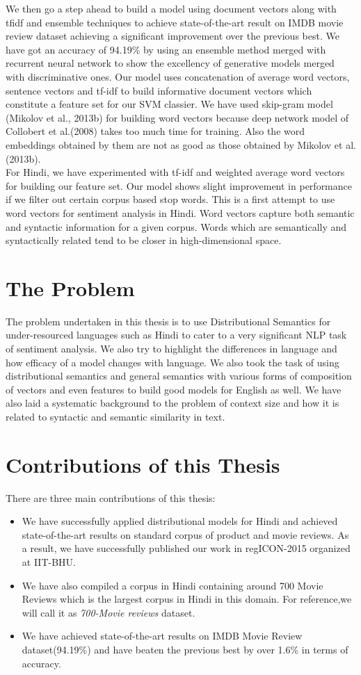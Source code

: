 We then go a step ahead to build a model using document vectors along with tfidf and ensemble techniques to achieve state-of-the-art result on IMDB movie review dataset achieving a significant improvement over the previous best. We have got an accuracy of 94.19\% by using an ensemble method merged with recurrent neural network to show the excellency of generative models merged with discriminative ones.
Our model uses concatenation of average word vectors, sentence vectors and tf-idf to build informative document vectors which constitute a feature set for our SVM classier. We have used skip-gram model (Mikolov et al., 2013b) for building word vectors because deep network model of Collobert et al.(2008) takes too much time for training. Also the word embeddings obtained by them are not as good as those obtained by Mikolov et al.(2013b). \\
For Hindi, we have experimented with tf-idf and weighted average word vectors for building our feature set. Our model shows slight improvement in performance if we filter out certain corpus based stop words. This is a first attempt to use word vectors for sentiment analysis in Hindi. Word vectors capture both semantic and syntactic information for a given corpus. Words which are semantically and syntactically related tend to be closer in high-dimensional space.\\

\section{The Problem}
The problem undertaken in this thesis is to use Distributional Semantics for under-resourced languages such as Hindi to cater to a very significant NLP task of sentiment analysis. We also try to highlight the differences in language and how efficacy of a model changes with language. We also took the task of using distributional semantics and general semantics with various forms of composition of vectors and even features to build good models for English as well. We have also laid a systematic background to the problem of context size and how it is related to syntactic and semantic similarity in text. 

\section{Contributions of this Thesis}
There are three main contributions of this thesis:
\begin{itemize}
\item We have successfully applied distributional models for Hindi and achieved state-of-the-art results on standard corpus of product and movie reviews. As a result, we have successfully published our work in regICON-2015 organized at IIT-BHU.
\item We have also compiled a corpus in Hindi containing around 700 Movie Reviews which is the largest corpus in Hindi in this domain. For reference,we will call it as \emph{700-Movie reviews} dataset.
\item We have achieved state-of-the-art results on IMDB Movie Review dataset(94.19\%) and have beaten the previous best by over 1.6\% in terms of accuracy.
\end{itemize}

